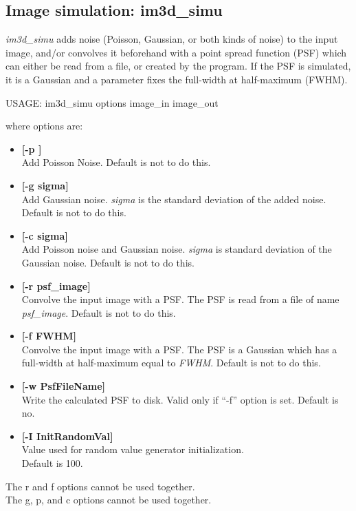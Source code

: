 \subsection{Image simulation: im3d\_simu}
{\em im3d\_simu} adds noise (Poisson, Gaussian, or both kinds of noise)
to the input image, and/or convolves it beforehand with a 
point spread function (PSF)
which can either be read from a file, or created by the program.
If the PSF is simulated, it is a Gaussian and a parameter fixes the
full-width at half-maximum (FWHM). 
{\bf
\begin{center}
USAGE: im3d\_simu options image\_in image\_out
\end{center}}
where options are:
\begin{itemize}
\baselineskip=0.4truecm
\itemsep=0.1truecm
\item {\bf[-p ]} \\
Add Poisson Noise. Default is not to do this.
\item{\bf [-g sigma]} \\
Add Gaussian noise. {\em sigma} is the standard 
deviation of the added noise. Default is not to do this.
\item{\bf [-c sigma]} \\
Add Poisson noise and Gaussian noise. 
{\em sigma} is standard deviation of the Gaussian noise. Default is not to do this.
\item{\bf [-r psf\_image]} \\
Convolve the input image with a PSF. The 
PSF is read from a file of name {\em psf\_image}. Default is not to do this.
 \item{\bf [-f FWHM]} \\
Convolve the input image with a PSF. The PSF
is a Gaussian which has a full-width at half-maximum equal 
to {\em FWHM}. Default is not to do this.
\item{\bf [-w PsfFileName]} \\
Write the calculated PSF to  disk. Valid only if ``-f'' option is set.
Default is no.
\item {\bf [-I InitRandomVal]} \\
Value used for random value generator initialization. \\
Default is 100. 
\end{itemize}
The r and f options cannot be used together. \\
The g, p, and c options cannot be used together.
